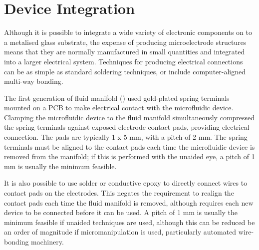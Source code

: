 \section{Device Integration}
\label{Section:Device_integration}

Although it is possible to integrate a wide variety of electronic components on to a metalised glass substrate, the expense of producing microelectrode structures means that they are normally manufactured in small quantities and integrated into a larger electrical system. Techniques for producing electrical connections can be as simple as standard soldering techniques, or include computer-aligned multi-way bonding.

The first generation of fluid manifold () used gold-plated spring terminals mounted on a PCB to make electrical contact with the microfluidic device. Clamping the microfluidic device to the fluid manifold simultaneously compressed the spring terminals against exposed electrode contact pads, providing electrical connection. The pads are typically 1 x 5 mm, with a pitch of 2 mm. The spring terminals must be aligned to the contact pads each time the microfluidic device is removed from the manifold; if this is performed with the unaided eye, a pitch of 1 mm is usually the minimum feasible.


It is also possible to use solder or conductive epoxy to directly connect wires to contact pads on the electrodes. This negates the requirement to realign the contact pads each time the fluid manifold is removed, although requires each new device to be connected before it can be used. A pitch of 1 mm is usually the minimum feasible if unaided techniques are used, although this can be reduced be an order of magnitude if micromanipulation is used, particularly automated wire-bonding machinery.


